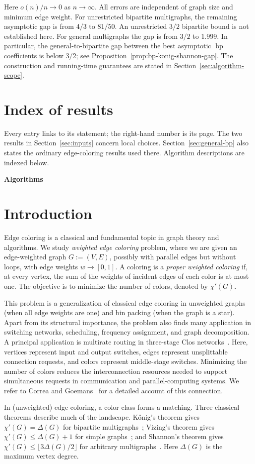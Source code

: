 \documentclass[11pt]{article}
\makeatletter
\theoremstyle{definition}\newtheorem{algorithm}{Algorithm}[section]
\numberwithin{equation}{section}
\theoremstyle{remark}\newtheorem*{remark}{Remark}
\newcommand{\bp}{\operatorname{bp}}
\newcommand{\listofresults}{%
  \section*{Index of results}%
  \pdfbookmark[0]{Index of results}{result-index}%
  Every entry links to its statement; the right-hand number is its page.
  The two results in Section~\ref{sec:inputs} concern local choices.
  Section~\ref{sec:general-bp} also states the ordinary edge-coloring
  results used there. Algorithm descriptions are indexed below.
  \par\medskip
  \begingroup\footnotesize\setlength{\parskip}{0pt}\@starttoc{res}\endgroup\par\medskip
  \noindent\textbf{Algorithms}\par\smallskip
  \begingroup\footnotesize\setlength{\parskip}{0pt}\@starttoc{alg}\endgroup}
\makeatother
\begin{document}
Here $o(n)/n\to0$ as $n\to\infty$. All errors are independent
of graph size and minimum edge weight. For unrestricted bipartite
multigraphs, the remaining asymptotic gap is from $4/3$ to $81/50$.
An unrestricted $3/2$ bipartite bound is not established here. For
general multigraphs the gap is from $3/2$ to $1.999$.
In particular, the general-to-bipartite gap between the best asymptotic
$\bp$ coefficients is below $3/2$; see
\hyperref[prop:bp-konig-shannon-gap]{Proposition~\ref*{prop:bp-konig-shannon-gap}}. The construction and running-time
guarantees are stated in Section~\ref{sec:algorithm-scope}.

\endgroup
\clearpage
\listofresults
\clearpage


\section{Introduction}

Edge coloring is a classical and fundamental topic in graph theory and algorithms. We study {\em weighted edge coloring} problem, where we are given an edge-weighted graph $G:=(V,E)$, possibly with parallel edges but without loops,  with edge weights $w \rightarrow [0,1]$. 
A coloring is a \emph{proper weighted coloring} if, at every vertex, the sum
of the weights of incident edges of each color is at most one. The objective
is to minimize the number of colors, denoted by $\chi'(G)$.

This problem is a generalization of classical edge coloring in unweighted graphs (when all edge weights are one) and bin packing (when the graph is a star). Apart from its structural importance, the problem also finds many application in switching networks, scheduling, frequency assignment, and graph decomposition. 
A principal application is multirate routing in three-stage
Clos networks~\cite{Clos53,MT89,CR91}. Here, vertices represent input and
output switches, edges represent unsplittable connection requests, and
colors represent middle-stage switches. Minimizing the number of colors
reduces the interconnection resources needed to support simultaneous
requests in communication and parallel-computing systems. We refer to
Correa and Goemans~\cite{CG07} for a detailed account of this connection.


In (unweighted) edge coloring, a color class forms a matching.  Three classical theorems describe much of the landscape. 
K\H{o}nig's theorem gives $\chi'(G)=\Delta(G)$ for bipartite
multigraphs~\cite{Konig16}; Vizing's theorem gives
$\chi'(G)\le\Delta(G)+1$ for simple graphs~\cite{Vizing64}; and Shannon's
theorem gives $\chi'(G)\le\lfloor3\Delta(G)/2\rfloor$ for arbitrary
multigraphs~\cite{Shannon49}. Here $\Delta(G)$ is the maximum vertex degree.
\end{document}
